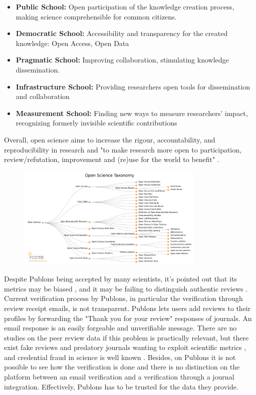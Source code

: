 \begin{itemize}
    \item \textbf{Public School:} Open participation of the knowledge creation process, making science comprehensible for common citizens.
    \item \textbf{Democratic School:} Accessibility and transparency for the created knowledge: Open Access, Open Data
    \item \textbf{Pragmatic School:} Improving collaboration, stimulating knowledge dissemination.
    \item \textbf{Infrastructure School:} Providing researchers open tools for dissemination and collaboration 
    \item \textbf{Measurement School:} Finding new ways to measure researchers' impact, recognizing formerly invisible scientific contributions
\end{itemize}

Overall, open science aims to increase the rigour, accountability, and reproducibility in research and "to make research more open to participation, review/refutation, improvement and (re)use for the world to benefit" \parencite{Bezjak.2018}.

\begin{figure}[htpb]
  \centering
  \includegraphics[width=0.8\textwidth]{figures/FOSTER.png}
  \caption{\parencite{Pontika.2015}} \label{fig:foster}
\end{figure}

Despite Publons being accepted by many scientists, it’s pointed out that its metrics may be biased \parencite{Ortega.2019}, and it may be failing to distinguish authentic reviews \parencite{TeixeiradaSilva.2020}. Current verification process by Publons, in particular the verification through review receipt emails, is not transparent. Publons lets users add reviews to their profiles by forwarding the "Thank you for your review" responses of journals. An email response is an easily forgeable and unverifiable message. There are no studies on the peer review data if this problem is practically relevant, but there exist fake reviews \parencite{retraction, Qi.2017, TeixeiradaSilva.2017} and predatory journals wanting to exploit scientific metrics \parencite{xia2015publishes, demir2018predatory}, and credential fraud in science is well known \parencite{Wilson.2020}. Besides, on Publons it is not possible to see how the verification is done and there is no distinction on the platform between an email verification and a verification through a journal integration. Effectively, Publons has to be trusted for the data they provide.

